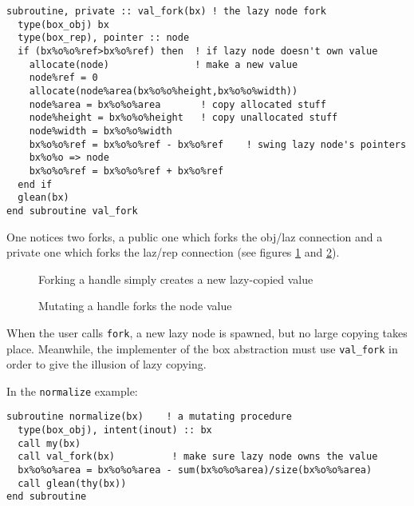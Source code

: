 \begin{verbatim}
subroutine, private :: val_fork(bx) ! the lazy node fork
  type(box_obj) bx
  type(box_rep), pointer :: node
  if (bx%o%o%ref>bx%o%ref) then  ! if lazy node doesn't own value
    allocate(node)               ! make a new value
    node%ref = 0
    allocate(node%area(bx%o%o%height,bx%o%o%width))
    node%area = bx%o%o%area       ! copy allocated stuff
    node%height = bx%o%o%height   ! copy unallocated stuff
    node%width = bx%o%o%width
    bx%o%o%ref = bx%o%o%ref - bx%o%ref    ! swing lazy node's pointers
    bx%o%o => node
    bx%o%o%ref = bx%o%o%ref + bx%o%ref
  end if
  glean(bx)
end subroutine val_fork

\end{verbatim}

One notices two forks, a public one which forks the obj/laz connection
and a private one which forks the laz/rep connection (see figures
\ref{complexforkfig} and \ref{complexfork2fig}).

\begin{figure}
\begin{center}
\caption{Forking a handle simply creates a new lazy-copied value}
\label{complexforkfig}
\end{center}
\end{figure}

\begin{figure}
\begin{center}
\caption{Mutating a handle forks the node value}
\label{complexfork2fig}
\end{center}
\end{figure}

When the user calls \verb+fork+, a new lazy node is spawned, but no
large copying takes place.  Meanwhile, the implementer of the box abstraction
must use \verb+val_fork+ in order to give the illusion of lazy copying.

In the \verb+normalize+ example:
\begin{verbatim}
subroutine normalize(bx)    ! a mutating procedure
  type(box_obj), intent(inout) :: bx
  call my(bx)
  call val_fork(bx)          ! make sure lazy node owns the value
  bx%o%o%area = bx%o%o%area - sum(bx%o%o%area)/size(bx%o%o%area)
  call glean(thy(bx))
end subroutine
\end{verbatim}

